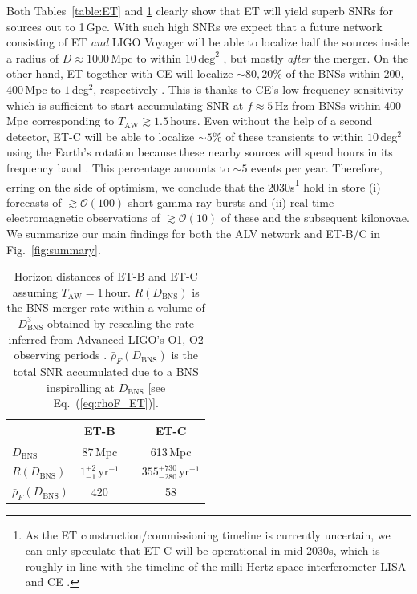 \documentclass[prd,amsmath,amssymb,aps,floats,amsfonts,notitlepage,superscriptaddress,eqsecnum,nofootinbib,10pt]{revtex4-1}
\newcommand{\ord}{\mathcal{O}}
\newcommand\T{\rule{0pt}{2.6ex}}       %
\newcommand\B{\rule[-1.2ex]{0pt}{0pt}} %
\begin{document}
Both Tables~\ref{table:ET} and \ref{table:horizon} clearly show that ET will yield superb SNRs for sources out to 1\,Gpc. 
With such high SNRs we expect that a future network consisting of ET \emph{and} LIGO Voyager will be able to localize half the sources 
inside a radius of $D\approx 1000\,$Mpc to within $ 10\,\text{deg}^2$ \cite{Mills:2017urp}, but mostly \emph{after} the merger.
On the other hand, ET together with CE will localize 
$\sim 80, 20\%$ of the BNSs
within 200, 400\,Mpc to $1\,$deg$^2$, respectively \cite{Chan:2018csa}.
This is thanks to CE's low-frequency sensitivity which is sufficient to start accumulating SNR at $f\approx 5\,$Hz from BNSs within 400\,Mpc corresponding to $T_\text{AW}\gtrsim 1.5\,$hours.
Even without the help of a second detector, ET-C will be able
to localize $\sim 5\%$ of these transients to within $10\,$deg$^2$ using
the Earth's rotation because these nearby sources will spend hours in its frequency band \cite{Zhao:2017cbb}.
This percentage amounts to $\sim 5$ events per year.
Therefore, erring on the side of optimism, we conclude that the 2030s\footnote{As the ET construction/commissioning timeline is currently uncertain, we can only speculate that ET-C will be operational in mid 2030s,
which is roughly in line with the timeline of the milli-Hertz space interferometer LISA \cite{Audley:2017drz} and CE \cite{LIGO_inst}.} 
hold in store 
(i) forecasts of $\gtrsim \ord(100)$ short gamma-ray bursts and
(ii) real-time electromagnetic observations of $\gtrsim \ord(10)$ of these and the subsequent kilonovae.
%
We summarize our main findings for both the ALV network and ET-B/C in Fig.~\ref{fig:summary}.
%
%
%
\begin{table}[h]
\centering
\begin{tabular}{lccc}
\hline\hline
 & ET-B & & ET-C\T\B\\
\hline
  $D_\text{BNS} $& 87\,Mpc& &{613\,Mpc}\T\\
  $R(D_\text{BNS}) $& $1^{+2}_{-1}\,\text{yr}^{-1}$&\hspace{5mm} &{$355^{+730}_{-280}\,\text{yr}^{-1}$}\T\\
  $\bar\rho_F(D_\text{BNS})$ & 420 &&{58}\T\B\\
\hline\hline
\end{tabular}
\caption{Horizon distances of ET-B and ET-C assuming $T_\text{AW} =1\,$hour. $R(D_\text{BNS})$ is the BNS merger rate within a volume of $D_\text{BNS}^3$
obtained by rescaling the rate inferred from Advanced LIGO's O1, O2 observing periods \cite{GW170817}. $\bar\rho_F(D_\text{BNS})$ is the total SNR accumulated due to a BNS inspiralling at $D_\text{BNS}$ [see Eq.~(\ref{eq:rhoF_ET})].}\label{table:horizon}
\end{table}
\end{document}
